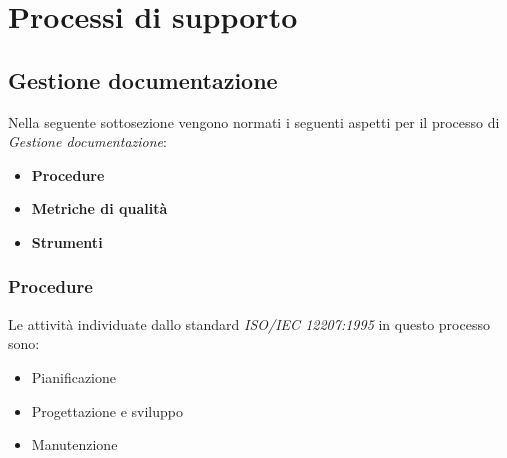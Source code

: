 \section{Processi di supporto}
\subsection{Gestione documentazione}
Nella seguente sottosezione vengono normati i seguenti aspetti per il
processo di \textit{Gestione documentazione}:
\begin{itemize}
    \item \textbf{Procedure}
    \item \textbf{Metriche di qualità}
    \item \textbf{Strumenti}
\end{itemize}

\subsubsection{Procedure}
Le attività individuate dallo standard \textit{ISO/IEC 12207:1995} in questo processo sono:
\begin{itemize}
    \item Pianificazione
    \item Progettazione e sviluppo
    \item Manutenzione
\end{itemize}

